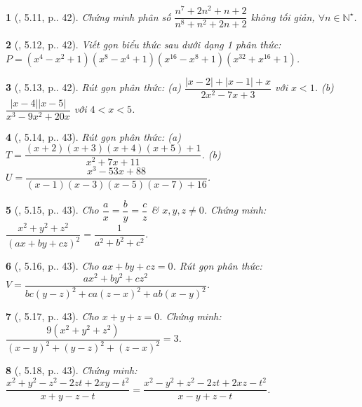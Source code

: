 \documentclass{article}
\newtheorem{baitoan}{}
\begin{document}
\begin{baitoan}[\cite{TLCT_THCS_Toan_8_dai_so}, 5.11, p.. 42]
	Chứng minh phân số $\dfrac{n^7 + 2n^2 + n + 2}{n^8 + n^2 + 2n + 2}$ không tối giản, $\forall n\in\mathbb{N}^\star$.
\end{baitoan}

\begin{baitoan}[\cite{TLCT_THCS_Toan_8_dai_so}, 5.12, p.. 42]
	Viết gọn biểu thức sau dưới dạng 1 phân thức: $P = (x^4 - x^2 + 1)(x^8 - x^4 + 1)(x^{16} - x^8 + 1)(x^{32} + x^{16} + 1)$.
\end{baitoan}

\begin{baitoan}[\cite{TLCT_THCS_Toan_8_dai_so}, 5.13, p.. 42]
	Rút gọn phân thức: (a) $\dfrac{|x - 2| + |x - 1| + x}{2x^2 - 7x + 3}$ với $x < 1$. (b) $\dfrac{|x - 4||x - 5|}{x^3 - 9x^2 + 20x}$ với $4 < x < 5$.	
\end{baitoan}

\begin{baitoan}[\cite{TLCT_THCS_Toan_8_dai_so}, 5.14, p.. 43]
	Rút gọn phân thức: (a) $T = \dfrac{(x + 2)(x + 3)(x + 4)(x + 5) + 1}{x^2 + 7x + 11}$. (b) $U = \dfrac{x^3 - 53x + 88}{(x - 1)(x - 3)(x - 5)(x - 7) + 16}$.	
\end{baitoan}

\begin{baitoan}[\cite{TLCT_THCS_Toan_8_dai_so}, 5.15, p.. 43]
	Cho $\dfrac{a}{x} = \dfrac{b}{y} = \dfrac{c}{z}$ \& $x,y,z\ne 0$. Chứng minh: $\dfrac{x^2 + y^2 + z^2}{(ax + by + cz)^2} = \dfrac{1}{a^2 + b^2 + c^2}$.
\end{baitoan}

\begin{baitoan}[\cite{TLCT_THCS_Toan_8_dai_so}, 5.16, p.. 43]
	Cho $ax + by + cz = 0$. Rút gọn phân thức: $V = \dfrac{ax^2 + by^2 + cz^2}{bc(y - z)^2 + ca(z - x)^2 + ab(x - y)^2}$.
\end{baitoan}

\begin{baitoan}[\cite{TLCT_THCS_Toan_8_dai_so}, 5.17, p.. 43]
	Cho $x + y + z = 0$. Chứng minh: $\dfrac{9(x^2 + y^2 + z^2)}{(x - y)^2 + (y - z)^2 + (z - x)^2} = 3$.
\end{baitoan}

\begin{baitoan}[\cite{TLCT_THCS_Toan_8_dai_so}, 5.18, p.. 43]
	Chứng minh: $\dfrac{x^2 + y^2 - z^2 - 2zt + 2xy - t^2}{x + y - z - t} = \dfrac{x^2 - y^2 + z^2 - 2zt + 2xz - t^2}{x - y + z - t}$.
\end{baitoan}
\end{document}
